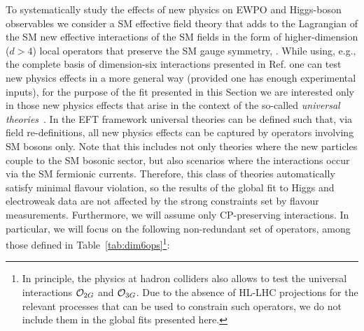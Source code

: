 

\newcommand{\HEPfit}{{\tt HEPfit}}


\label{sec8:universalewpo}


\label{sec:general-framework}

To systematically study the effects of new physics on EWPO and
Higgs-boson observables we consider a SM effective field theory
 that adds to the Lagrangian of the SM new effective
interactions of the SM fields in the form of higher-dimension ($d>4$)
local operators that preserve the SM gauge symmetry, .
While using, e.g., the
complete basis of dimension-six interactions presented in
Ref. \cite{Grzadkowski:2010es} one can test new physics effects in 
a more general way (provided one has enough experimental inputs),
for the purpose of the fit presented in this Section we are interested only in those
new physics effects that arise in the context of the so-called {\it universal theories}~\cite{Barbieri:2004qk,Wells:2015uba}.
In the EFT framework universal theories can be defined such that, via field re-definitions, all new physics effects
can be captured by operators involving SM bosons only. Note that this includes not only theories where the
new particles couple to the SM bosonic sector, but also scenarios where the interactions 
occur via the SM fermionic currents. Therefore, this class of theories automatically 
satisfy minimal flavour violation, so the results of the global fit to Higgs and electroweak data 
are not affected by the strong constraints set by flavour measurements. Furthermore,
we will assume only CP-preserving interactions. 
In particular, we will focus on the following non-redundant set of operators, among those defined in Table~\ref{tab:dim6ops}\footnote{In principle, the physics at hadron colliders also allows to test the universal interactions ${\cal O}_{2G}$ and ${\cal O}_{3G}$. Due to the absence of HL-LHC projections for the relevant processes that can be used to constrain such operators, we do not include them in the global fits presented here.}: 
